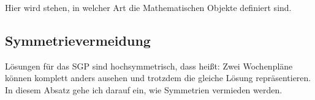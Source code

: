 
Hier wird stehen, in welcher Art die Mathematischen Objekte definiert sind.

\subsection{Symmetrievermeidung}
Lösungen für das SGP sind hochsymmetrisch, dass heißt: Zwei Wochenpläne können komplett anders ausehen und trotzdem die gleiche Lösung repräsentieren. In diesem Absatz gehe ich darauf ein, wie Symmetrien vermieden werden.
